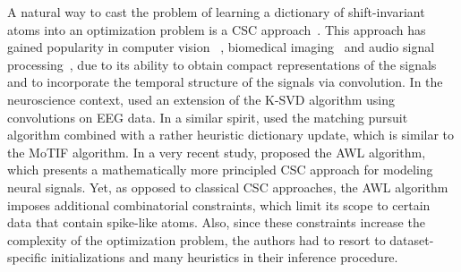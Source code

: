 A natural way to cast the problem of learning a dictionary of shift-invariant atoms into an optimization problem is a \ac{CSC} approach~\citep{Grosse-etal:2007}. 
This approach has gained popularity in computer vision~\citep{heide2015fast,wohlberg2016efficient,zeiler2010deconvolutional, vsorel2016fast,kavukcuoglu2010learning}%
, biomedical imaging~\citep{pachitariu2013extracting} and audio signal processing~\citep{Grosse-etal:2007,mailhe2008shift},
due to its ability to obtain compact representations of the signals and to incorporate the temporal structure of the signals via convolution.
In the neuroscience context, \citet{barthelemy2013multivariate} used an extension of the K-SVD algorithm using convolutions on EEG data. 
In a similar spirit, \citet{brockmeier2016learning} used the matching pursuit algorithm combined with a rather heuristic  
dictionary update, which is similar to the MoTIF algorithm. 
%
In a very recent study, \citet{hitziger2017adaptive} proposed the AWL algorithm, which presents a mathematically more principled \ac{CSC} approach for modeling neural signals. Yet, as opposed to classical \ac{CSC} approaches, the AWL algorithm imposes additional combinatorial  constraints, which limit its scope to certain data that contain spike-like atoms. Also, since these constraints increase the complexity of the optimization problem, the authors had to resort to dataset-specific initializations and many heuristics in their inference procedure.




